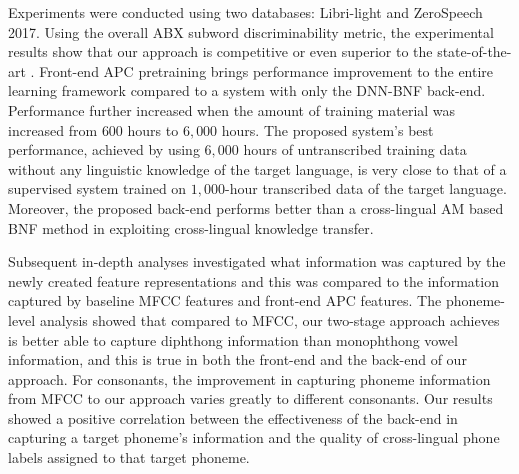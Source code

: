 \documentclass[transmag]{IEEEtran}
\begin{document}

Experiments were conducted using two databases: Libri-light and ZeroSpeech 2017. Using the overall ABX subword discriminability metric, 
the experimental results show that our approach is competitive or even superior to the state-of-the-art \cite{Kharitonov2020data_augment}. Front-end APC pretraining brings performance improvement to the entire learning framework compared to a system with only the DNN-BNF back-end. Performance further increased when the amount of training material was increased from $600$ hours to $6,000$ hours. The proposed system’s best performance, achieved by using $6,000$ hours of untranscribed training data without any linguistic knowledge of the target language, is very close to that of a supervised system trained on $1,000$-hour   transcribed data of the target language. Moreover,  the proposed back-end performs better than a cross-lingual AM based BNF method in exploiting cross-lingual knowledge transfer. 


Subsequent in-depth analyses investigated what information was captured by the newly created feature representations and this was compared to the information captured by baseline MFCC features and front-end APC features. The phoneme-level analysis showed that compared to MFCC, our two-stage approach achieves is better able to capture diphthong information than monophthong vowel information, and this is true in both the front-end and the back-end of our approach. For consonants, the improvement in capturing phoneme information from MFCC to our approach varies greatly to different consonants. Our results showed a positive correlation between the effectiveness of the back-end in capturing a target phoneme's information and the quality of cross-lingual phone labels assigned to that target phoneme.
\end{document}
